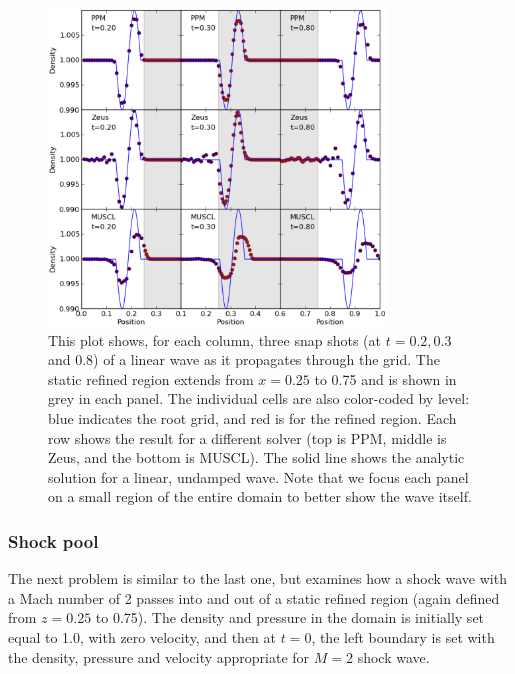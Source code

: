 \begin{figure}
\begin{center}
\includegraphics[width=0.8\textwidth]{figures/WavePool.eps}
\caption{This plot shows, for each column, three snap shots (at $t=0.2, 0.3$ and 0.8) of a linear wave as it propagates through the grid.  The static refined region extends from $x = 0.25$ to 0.75 and is shown in grey in each panel.  The individual cells are also color-coded by level: blue indicates the root grid, and red is for the refined region.  Each row shows the result for a different solver (top is PPM, middle is Zeus, and the bottom is MUSCL).   The solid line shows the analytic solution for a linear, undamped wave.  Note that we focus each panel on a small region of the entire domain to better show the wave itself.}
\label{fig.wavepool}
\end{center}
\end{figure}

\subsubsection{Shock pool}
\label{sec.tests.shockpool}

The next problem is similar to the last one, but examines how a shock wave with a Mach number of 2 passes into and out of a static refined region (again defined from $z=0.25$ to 0.75).  The density and pressure in the domain is initially set equal to 1.0, with zero velocity, and then at $t=0$, the left boundary is set with the density, pressure and velocity appropriate for $M=2$ shock wave.

